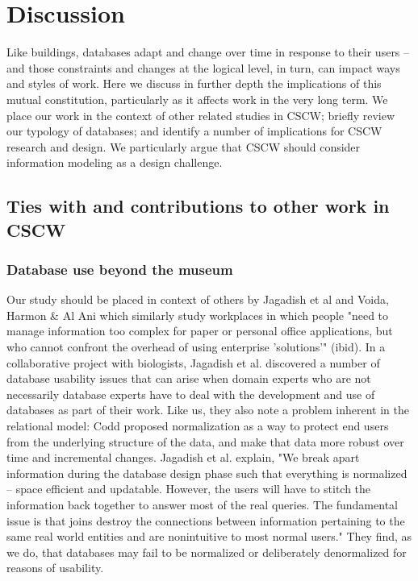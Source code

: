 \section{Discussion}

Like buildings, databases adapt and change over time in response to their users -- and those constraints and changes at the logical level, in turn, can impact ways and styles of work. Here we discuss in further depth the implications of this mutual constitution, particularly as it affects work in the very long term. We place our work in the context of other related studies in CSCW; briefly review our typology of databases; and identify a number of implications for CSCW research and design. We particularly argue that CSCW should consider information modeling as a design challenge.

\subsection {Ties with and contributions to other work in CSCW}
\subsubsection{Database use beyond the museum}

Our study should be placed in context of others by Jagadish et al \cite{jagadish2007making} and Voida, Harmon & Al Ani \cite{voida2011homebrew} which similarly study workplaces in which people "need to manage information too complex for paper or personal office applications, but who cannot confront the overhead of using enterprise 'solutions'" (ibid). In a collaborative project with biologists, Jagadish et al. discovered a number of database usability issues that can arise when domain experts who are not necessarily database experts have to deal with the development and use of databases as part of their work. Like us, they also note a problem inherent in the relational model: Codd proposed normalization as a way to protect end users from the underlying structure of the data, and make that data more robust over time and incremental changes. Jagadish et al. explain, "We break apart information during the database design phase such that everything is normalized -- space efficient and updatable. However, the users will have to stitch the information back together to answer most of the real queries. The fundamental issue is that joins destroy the connections between information pertaining to the same real world entities and are nonintuitive to most normal users."  They find, as we do, that databases may fail to be normalized or deliberately denormalized for reasons of usability.

